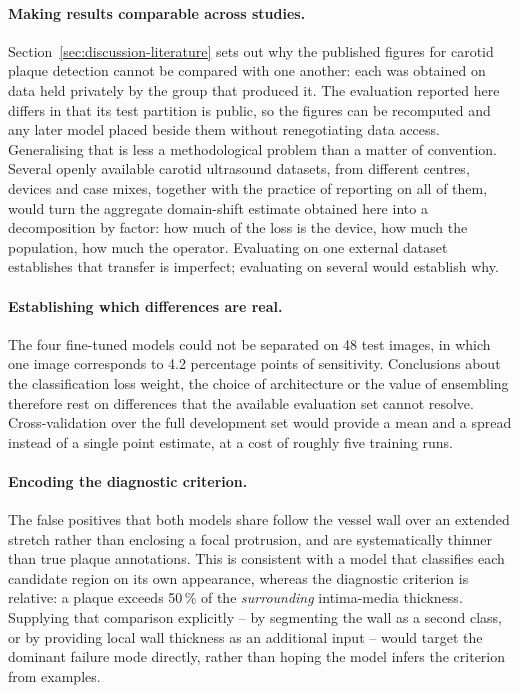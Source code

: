 \paragraph{Making results comparable across studies.}
Section~\ref{sec:discussion-literature} sets out why the published figures for carotid plaque
detection cannot be compared with one another: each was obtained on data held privately by the
group that produced it. The evaluation reported here differs in that its test partition is
public, so the figures can be recomputed and any later model placed beside them without
renegotiating data access. Generalising that is less a methodological problem than a matter of
convention. Several openly available carotid ultrasound datasets, from different centres, devices
and case mixes, together with the practice of reporting on all of them, would turn the aggregate
domain-shift estimate obtained here into a decomposition by factor: how much of the loss is the
device, how much the population, how much the operator. Evaluating on one external dataset
establishes that transfer is imperfect; evaluating on several would establish why.

\paragraph{Establishing which differences are real.}
The four fine-tuned models could not be separated on 48 test images, in which one image
corresponds to 4.2 percentage points of sensitivity. Conclusions about the classification loss
weight, the choice of architecture or the value of ensembling therefore rest on differences that
the available evaluation set cannot resolve. Cross-validation over the full development set would
provide a mean and a spread instead of a single point estimate, at a cost of roughly five
training runs.

\paragraph{Encoding the diagnostic criterion.}
The false positives that both models share follow the vessel wall over an extended stretch
rather than enclosing a focal protrusion, and are systematically thinner than true plaque
annotations. This is consistent with a model that classifies each candidate region on its own
appearance, whereas the diagnostic criterion is relative: a plaque exceeds 50\,\% of the
\emph{surrounding} intima-media thickness. Supplying that comparison explicitly -- by segmenting
the wall as a second class, or by providing local wall thickness as an additional input -- would
target the dominant failure mode directly, rather than hoping the model infers the criterion from
examples.

